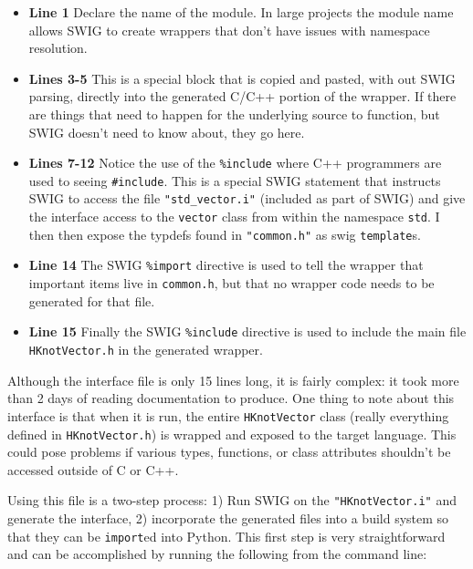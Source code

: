     \begin{itemize}
      \item \textbf{Line 1} Declare the name of the module. In large projects the module name allows SWIG to create wrappers that don't have issues with namespace resolution.
      \item \textbf{Lines 3-5} This is a special block that is copied and pasted, with out SWIG parsing, directly into the generated C/C++ portion of the wrapper. If there are things that need to happen for the underlying source to function, but SWIG doesn't need to know about, they go here.
      \item \textbf{Lines 7-12} Notice the use of the \texttt{\%include} where C++ programmers are used to seeing \texttt{\#include}. This is a special SWIG statement that instructs SWIG to access the file \texttt{"std\_vector.i"} (included as part of SWIG) and give the interface access to the \texttt{vector} class from within the namespace \texttt{std}. I then then expose the typdefs found in \texttt{"common.h"} as swig \texttt{template}s.
      \item \textbf{Line 14} The SWIG \texttt{\%import} directive is used to tell the wrapper that important items live in \texttt{common.h}, but that no wrapper code needs to be generated for that file.
      \item \textbf{Line 15} Finally the SWIG \texttt{\%include} directive is used to include the main file \texttt{HKnotVector.h} in the generated wrapper.
    \end{itemize}
    \mainstretch{}

    \noindent Although the interface file is only 15 lines long, it is fairly complex: it took more than 2 days of reading documentation to produce.  One thing to note about this interface is that when it is run, the entire \texttt{HKnotVector} class (really everything defined in \texttt{HKnotVector.h}) is wrapped and exposed to the target language. This could pose problems if various types, functions, or class attributes shouldn't be accessed outside of C or C++.

    Using this file is a two-step process: 1) Run SWIG on the \texttt{"HKnotVector.i"} and generate the interface, 2) incorporate the generated files into a build system so that they can be \texttt{import}ed into Python. This first step is very straightforward and can be accomplished by running the following from the command line:

